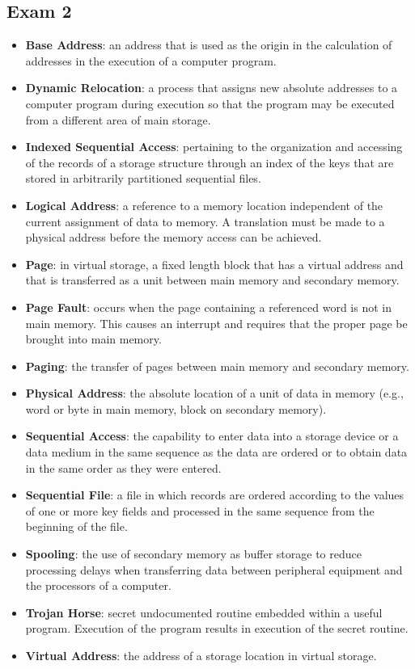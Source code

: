 \documentclass[fontsize=4.5pt]{scrartcl}
\begin{document}
\begin{multicols}{3}
    \subsection{Exam 2}
      \begin{itemize}
         \item \textbf{Base Address}: an address that is used as the origin in the calculation of addresses in the execution of a computer program.
         \item \textbf{Dynamic Relocation}: a process that assigns new absolute addresses to a computer program during execution so that the program may be executed from a different area of main storage.
         \item \textbf{Indexed Sequential Access}: pertaining to the organization and accessing of the records of a storage structure through an index of the keys that are stored in arbitrarily partitioned sequential files.
         \item \textbf{Logical Address}: a reference to a memory location independent of the current assignment of data to memory.  A translation must be made to a physical address before the memory access can be achieved.
         \item \textbf{Page}: in virtual storage, a fixed length block that has a virtual address and that is transferred as a unit between main memory and secondary memory.
         \item \textbf{Page Fault}: occurs when the page containing a referenced word is not in main memory.  This causes an interrupt and requires that the proper page be brought into main memory.
         \item \textbf{Paging}: the transfer of pages between main memory and secondary memory.
         \item \textbf{Physical Address}: the absolute location of a unit of data in memory (e.g., word or byte in main memory, block on secondary memory).
         \item \textbf{Sequential Access}: the capability to enter data into a storage device or a data medium in the same sequence as the data are ordered or to obtain data in the same order as they were entered.
         \item \textbf{Sequential File}: a file in which records are ordered according to the values of one or more key fields and processed in the same sequence from the beginning of the file.
         \item \textbf{Spooling}: the use of secondary memory as buffer storage to reduce processing delays when transferring data between peripheral equipment and the processors of a computer.
         \item \textbf{Trojan Horse}: secret undocumented routine embedded within a useful program.  Execution of the program results in execution of the secret routine.
         \item \textbf{Virtual Address}: the address of a storage location in virtual storage.
      \end{itemize}
    

\end{multicols}
\end{document}
